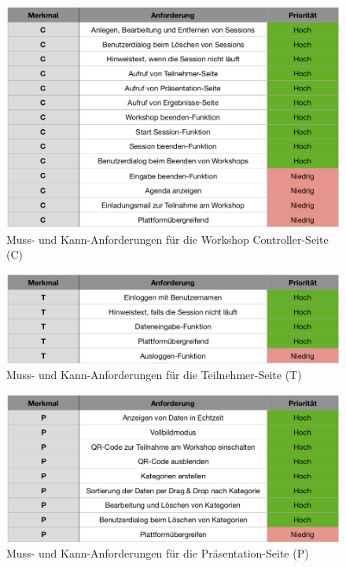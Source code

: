 \begin{figure}[H]
  \centering  
  \includegraphics[scale=0.6]{img/Controller-Seite.png}
  \caption{Muss- und Kann-Anforderungen für die Workshop Controller-Seite (C)}
  \label{fig:controller-seite}
\end{figure}

\begin{figure}[H]
  \centering  
  \includegraphics[scale=0.6]{img/Teilnehmer-Seite.png}
  \caption{Muss- und Kann-Anforderungen für die Teilnehmer-Seite (T)}
  \label{fig:teilnehmer-seite}
\end{figure}

\begin{figure}[H]
  \centering  
  \includegraphics[scale=0.6]{img/Presentation-Seite.png}
  \caption{Muss- und Kann-Anforderungen für die Präsentation-Seite (P)}	
  \label{fig:presentation-seite}
\end{figure}

